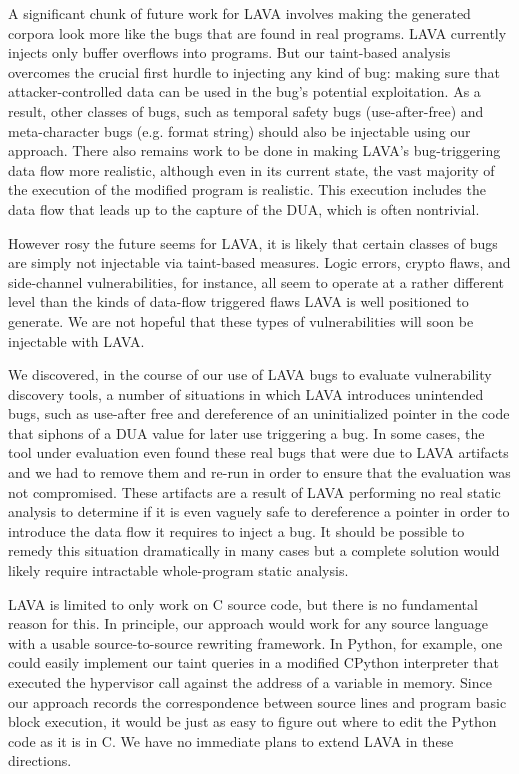 
A significant chunk of future work for LAVA involves making the generated corpora look more like the bugs that are found in real programs. 
LAVA currently injects only buffer overflows into programs.
But our taint-based analysis overcomes the crucial first hurdle to injecting any kind of bug: making sure that attacker-controlled data can be used in the bug's potential exploitation. 
As a result, other classes of bugs, such as temporal safety bugs (use-after-free) and meta-character bugs (e.g. format string) should also be injectable using our approach. 
There also remains work to be done in making LAVA's bug-triggering data flow more realistic, although even in its current state, the vast majority of the execution of the modified program is realistic. 
This execution includes the data flow that leads up to the capture of the DUA, which is often nontrivial.

However rosy the future seems for LAVA, it is likely that certain classes of bugs are simply not injectable via taint-based measures.
Logic errors, crypto flaws, and side-channel vulnerabilities, for instance, all seem to operate at a rather different level than the kinds of data-flow triggered flaws LAVA is well positioned to generate.
We are not hopeful that these types of vulnerabilities will soon be injectable with LAVA. 

We discovered, in the course of our use of LAVA bugs to evaluate vulnerability discovery tools, a number of situations in which LAVA introduces unintended bugs, such as use-after free and dereference of an uninitialized pointer in the code that siphons of a DUA value for later use triggering a bug.  
In some cases, the tool under evaluation even found these real bugs that were due to LAVA artifacts and we had to remove them and re-run in order to ensure that the evaluation was not compromised. 
These artifacts are a result of LAVA performing no real static analysis to determine if it is even vaguely safe to dereference a pointer in order to introduce the data flow it requires to inject a bug.
It should be possible to remedy this situation dramatically in many cases but a complete solution would likely require intractable whole-program static analysis.  

LAVA is limited to only work on C source code, but there is no fundamental reason for this.
In principle, our approach would work for any source language with a usable source-to-source rewriting framework. 
In Python, for example, one could easily implement our taint queries in a modified CPython interpreter that executed the hypervisor call against the address of a variable in memory. 
Since our approach records the correspondence between source lines and program basic block execution, it would be just as easy to figure out where to edit the Python code as it is in C.
We have no immediate plans to extend LAVA in these directions.

